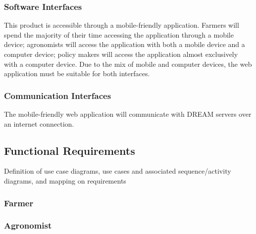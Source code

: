 \subsubsection{Software Interfaces}
This product is accessible through a mobile-friendly application. Farmers will spend the majority of their time accessing the application through a mobile device; agronomists will access the application with both a mobile device and a computer device; policy makers will access the application almost exclusively with a computer device. Due to the mix of mobile and computer devices, the web application must be suitable for both interfaces. 


\subsubsection{Communication Interfaces}
The mobile-friendly web application will communicate with DREAM servers over an internet connection. 

\subsection{Functional Requirements}
Definition of use case diagrams, use cases and associated sequence/activity diagrams, and mapping on requirements

\setcounter{usecase_counter}{1}



\subsubsection{Farmer}










\newpage
\subsubsection{Agronomist}

